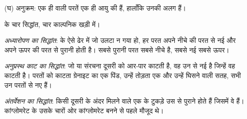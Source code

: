 \begin{omfigure}
\begin{minipage}[t]{0.49\linewidth}
{\small (घ)  अनुक्रम: एक ही  वाली परतें एक ही आयु की हैं, हालाँकि
उनकी  अलग हैं।}
\end{minipage}

\medskip
{\small {} के चार सिद्धांत, चार काल्पनिक खड़ी
 में।}
\label{fig:g7:geological-time:principles}
\end{omfigure}

\begin{definition}[अध्यारोपण का सिद्धांत]\label{def:g7:geological-time:superposition}
\emph{अध्यारोपण का सिद्धांत}:  के ऐसे
ढेर में जो उलटा न गया हो, हर परत अपने नीचे की परत से नई और अपने ऊपर की परत से
पुरानी होती है। सबसे पुरानी परत सबसे नीचे है, सबसे नई सबसे
ऊपर।
\end{definition}

\begin{definition}[अनुप्रस्थ काट का सिद्धांत]\label{def:g7:geological-time:cross-cutting}
\emph{अनुप्रस्थ काट का सिद्धांत}: जो  या संरचना दूसरी
 को आर-पार काटती है, वह उन  से नई है जिन्हें वह काटती है। परतों
को काटता ग्रेनाइट का एक पिंड, उन्हें तोड़ता एक  और उन्हें घिसने वाली 
सतह, सभी उन परतों से
नए हैं।
\end{definition}

\begin{definition}[अंतर्वेशन का सिद्धांत]\label{def:g7:geological-time:inclusion}
\emph{अंतर्वेशन का सिद्धांत}: किसी दूसरी  के
अंदर मिलने वाले एक  के टुकड़े उस  से पुराने होते हैं जिसमें वे हैं।
कांग्लोमरेट के  उसके चारों ओर कांग्लोमरेट बनने से पहले
मौजूद थे।
\end{definition}


